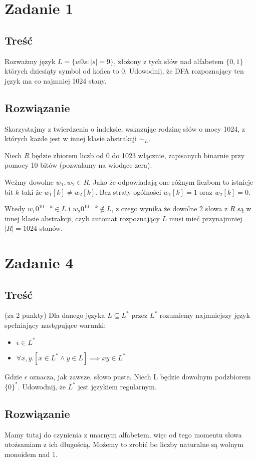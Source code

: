 \documentclass{article}
\begin{document}
\section*{Zadanie 1}
\subsection*{Treść}
Rozważmy język $L = \{w0s : |s| = 9\}$, złożony z tych słów nad alfabetem $\{0, 1\}$
których dziesiąty symbol od końca to 0. Udowodnij, że DFA rozpoznający ten język ma co
najmniej 1024 stany.
\subsection*{Rozwiązanie}
Skorzystajmy z twierdzenia o indeksie, wskazując rodzinę słów o mocy 1024, z których każde jest w innej klasie abstrakcji $\sim_L$.

Niech $R$ będzie zbiorem liczb od 0 do 1023 włącznie, zapisanych binarnie przy pomocy 10 bitów (pozwalamy na wiodące zera).

Weźmy dowolne $w_1, w_2 \in R$. Jako że odpowiadają one różnym liczbom to istnieje bit $k$ taki że $w_1 [ k ] \neq w_2[ k ]$.
Bez straty ogólności $w_1 [ k ] = 1$ oraz $ w_2 [ k ] = 0$.

Wtedy $w_1 0^{10 - k} \in L$ i $w_2 0^{10 - k} \notin L$, z czego wynika że dowolne 2 słowa z $R$ są w innej klasie abstrakcji, czyli
automat rozpoznający $L$ musi mieć przynajmniej $|R| = 1024$ stanów.

\section*{Zadanie 4}
\subsection*{Treść}
(za 2 punkty) Dla danego języka $L \subseteq L^*$ przez $L^*$ rozumiemy najmniejszy język
spełniający następujące warunki:
\begin{itemize}
    \item $\epsilon \in L^*$
    \item $\forall x, y. [ x \in L^* \land y \in L ] \implies  x y \in L^*$  
\end{itemize}
Gdzie $\epsilon$ oznacza, jak zawsze, słowo puste.
Niech L będzie dowolnym podzbiorem $\{ 0 \}^*$. Udowodnij, że $L^*$ jest językiem regularnym.

\subsection*{Rozwiązanie}
Mamy tutaj do czynienia z unarnym alfabetem, więc od tego momentu słowa utożsamiam z ich długością. 
Możemy to zrobić bo liczby naturalne są wolnym monoidem nad $1$.
\end{document}
